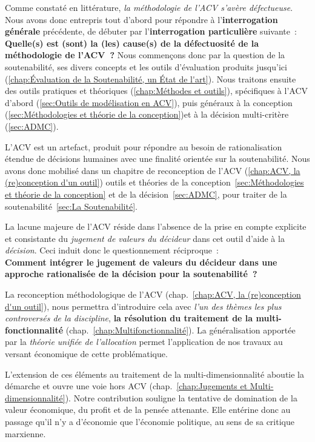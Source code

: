 Comme constaté en littérature, \emph{la méthodologie de l'\gls{ACV} s'avère défectueuse}.
Nous avons donc entrepris tout d'abord pour répondre à l'\textbf{interrogation générale} précédente, de débuter par l'\textbf{interrogation particulière} suivante~:
\textbf{Quelle(s) est (sont) la (les) cause(s) de la défectuosité de la méthodologie de l'ACV~?}
Nous commençons donc par la question de la soutenabilité, ses divers concepts et les outils d'évaluation produits jusqu'ici (\ref{chap:Évaluation de la Soutenabilité, un État de l'art}).
Nous traitons ensuite des outils pratiques et théoriques (\ref{chap:Méthodes et outils}), spécifiques à l'\gls{ACV} d'abord (\ref{sec:Outils de modélisation en ACV}), puis généraux à la conception (\ref{sec:Méthodologies et théorie de la conception})et à la décision multi-critère (\ref{sec:ADMC}).

L'ACV est un artefact, produit pour répondre au besoin de rationalisation étendue de décisions humaines avec une finalité orientée sur la soutenabilité.
Nous avons donc mobilisé dans un chapitre de reconception de l'ACV (\ref{chap:ACV, la (re)conception d'un outil}) outils et théories de la conception~\ref{sec:Méthodologies et théorie de la conception} et de la décision~\ref{sec:ADMC}, pour traiter de la soutenabilité~\ref{sec:La Soutenabilité}.

La lacune majeure de l'\gls{ACV} réside dans l'absence de la prise en compte explicite et consistante du \emph{jugement de valeurs du décideur} dans cet outil d'aide à la \emph{décision}.
Ceci induit donc le questionnement réciproque~:\\
\textbf{Comment intégrer le jugement de valeurs du décideur dans une approche rationalisée de la décision pour la soutenabilité~?}

La reconception méthodologique de l'ACV (chap.~\ref{chap:ACV, la (re)conception d'un outil}), nous permettra d'introduire cela avec \emph{l'un des thèmes les plus controversés de la discipline}, \textbf{la résolution du traitement de la multi-fonctionnalité} (chap.~\ref{chap:Multifonctionnalité}).
La généralisation apportée par la \emph{théorie unifiée de l'allocation} permet l'application de nos travaux au versant économique de cette problématique.

L’extension de ces éléments au traitement de la multi-dimensionnalité aboutie la démarche et ouvre une voie hors ACV (chap.~\ref{chap:Jugements et Multi-dimensionnalité}).
Notre contribution souligne la tentative de domination de la valeur économique, du profit et de la pensée attenante.
Elle entérine donc au passage qu'il n'y a d'économie que l'économie politique, au sens de sa critique marxienne.


